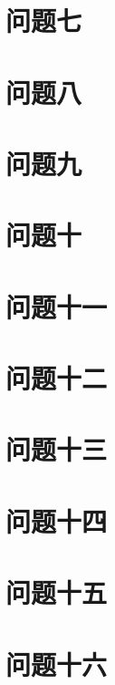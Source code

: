 \documentclass[fontset=windowsnew,zihao=-4,scheme=chinese,punct=quanjiao,linespread=1,UTF8]{ctexart}
\begin{document}
\section{问题七}

\section{问题八}

\section{问题九}

\section{问题十}

\section{问题十一}

\section{问题十二}

\section{问题十三}

\section{问题十四}

\section{问题十五}

\section{问题十六}

\end{document}
